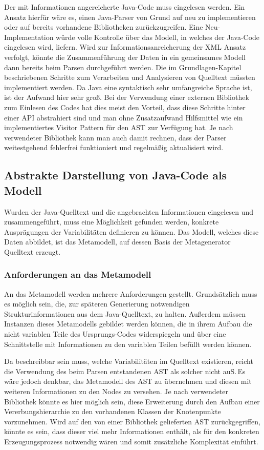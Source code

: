 \documentclass[12pt,oneside,a4paper,parskip]{scrbook}
\begin{document}
Der mit Informationen angereicherte Java-Code muss eingelesen werden. Ein Ansatz hierfür wäre es, einen Java-Parser von Grund auf neu zu implementieren oder auf bereits vorhandene Bibliotheken zurückzugreifen. Eine Neu-Implementation würde volle Kontrolle über das Modell, in welches der Java-Code eingelesen wird, liefern. Wird zur Informationsanreicherung der XML Ansatz verfolgt, könnte die Zusammenführung der Daten in ein gemeinsames Modell dann bereits beim Parsen durchgeführt werden. Die im Grundlagen-Kapitel beschriebenen Schritte zum Verarbeiten und Analysieren von Quelltext müssten implementiert werden. Da Java eine syntaktisch sehr umfangreiche Sprache ist, ist der Aufwand hier sehr groß. Bei der Verwendung einer externen Bibliothek zum Einlesen des Codes hat dies meist den Vorteil, dass diese Schritte hinter einer API abstrahiert sind und man ohne Zusatzaufwand Hilfsmittel wie ein implementiertes Visitor Pattern für den AST zur Verfügung hat. Je nach verwendeter Bibliothek kann man auch damit rechnen, dass der Parser weitestgehend fehlerfrei funktioniert und regelmäßig aktualisiert wird.

\subsection{Abstrakte Darstellung von Java-Code als Modell}\label{sec:codeasmodel}

Wurden der Java-Quelltext und die angebrachten Informationen eingelesen und zusammengeführt, muss eine Möglichkeit gefunden werden, konkrete Ausprägungen der Variabilitäten definieren zu können. Das Modell, welches diese Daten abbildet, ist das Metamodell, auf dessen Basis der Metagenerator Quelltext erzeugt.

\subsubsection{Anforderungen an das Metamodell}

An das Metamodell werden mehrere Anforderungen gestellt. Grundsätzlich muss es möglich sein, die, zur späteren Generierung notwendigen Strukturinformationen aus dem Java-Quelltext, zu halten. Außerdem müssen Instanzen dieses Metamodells gebildet werden können, die in ihrem Aufbau die nicht variablen Teile des Ursprungs-Codes widerspiegeln und über eine Schnittstelle mit Informationen zu den variablen Teilen befüllt werden können.

Da beschreibbar sein muss, welche Variabilitäten im Quelltext existieren, reicht die Verwendung des beim Parsen entstandenen AST als solcher nicht auS.\,Es wäre jedoch denkbar, das Metamodell des AST zu übernehmen und diesen mit weiteren Informationen zu den Nodes zu versehen. Je nach verwendeter Bibliothek könnte es hier möglich sein, diese Erweiterung durch den Aufbau einer Vererbungshierarchie zu den vorhandenen Klassen der Knotenpunkte vorzunehmen. Wird auf den von einer Bibliothek gelieferten AST zurückgegriffen, könnte es sein, dass dieser viel mehr Informationen enthält, als für den konkreten Erzeugungsprozess notwendig wären und somit zusätzliche Komplexität einführt.
\end{document}

